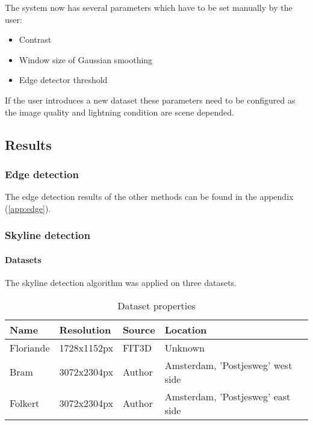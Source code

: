 The system now has several parameters which have to be set manually by the user:
\begin{itemize}
	\item Contrast
	\item Window size of Gaussian smoothing 
	\item Edge detector threshold
\end{itemize}

If the user introduces a new dataset these parameters need to be configured
as the image quality and lightning condition are scene depended.


\subsection{Results}
\subsubsection{Edge detection}
\label{sec:ResultEdge}
The edge detection results of the other methods can be found in the appendix
(\ref{app:edge}).
\clearpage


\subsubsection{Skyline detection}
\paragraph{Datasets}
The skyline detection algorithm was applied on three datasets. 

\begin{table}[ht]
\caption{Dataset properties}
\begin{tabular}{|l||l|l|l|}
\hline
Name 	& Resolution 	& Source	& Location\\
\hline
\hline
Floriande & 1728x1152px  & FIT3D \cite{FIT3D}  	& Unknown\\
\hline
Bram	 & 3072x2304px  & Author					& Amsterdam, 'Postjesweg' west side\\
\hline
Folkert  & 3072x2304px  & Author					& Amsterdam, 'Postjesweg' east side\\
\hline
\end{tabular}
\end{table}

